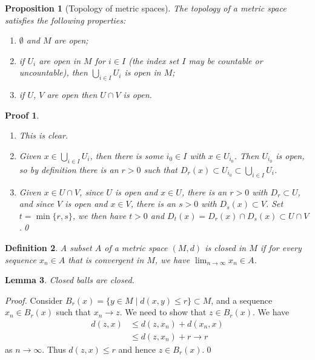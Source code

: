 \documentclass{article}
\theoremstyle{plain}\theoremheaderfont{\normalfont\itshape}\theorembodyfont{\rmfamily}\theoremseparator{.}\newtheorem*{rem}{Remark}\newtheorem*{ex}{Example}\newtheorem*{proof}{Proof}\newtheorem*{altp}{Alternative proof}
\theoremstyle{plain}\theoremheaderfont{\normalfont\bfseries}\theorembodyfont{\rmfamily}\theoremseparator{.}\newtheorem{thm}{Theorem}[section]\newtheorem{lem}[thm]{Lemma}\newtheorem{prop}[thm]{Proposition}\newtheorem*{cor}{Corollary}\newtheorem{defn}[thm]{Definition}\newtheorem{clm}[thm]{Claim}\newtheorem{clminproof}{Claim}
\theoremstyle{break}\theoremheaderfont{\normalfont\itshape}\theorembodyfont{\rmfamily}\theoremseparator{.\medskip}\newtheorem*{proofskip}{Proof}\newtheorem*{exs}{Examples}\newtheorem*{rems}{Remarks}
\theoremstyle{break}\theoremheaderfont{\normalfont\bfseries}\theorembodyfont{\rmfamily}\theoremseparator{.\medskip}\newtheorem{lemskip}[thm]{Lemma}\newtheorem{defnskip}[thm]{Definition}\newtheorem{propskip}[thm]{Proposition}\newtheorem{thmskip}[thm]{Theorem}
\newcommand{\qed}{\hfill\ensuremath{\Box}}
\begin{document}
    \begin{prop}[Topology of metric spaces]
        The topology of a metric space satisfies the following properties:
        \begin{enumerate}[label=(\roman*),topsep=0pt]
            \item \(\emptyset\) and \(M\) are open;
            \item if \(U_i\) are open in \(M\) for \(i\in I\) (the index set \(I\) may be countable or uncountable), then \(\bigcup_{i\in I}U_i\) is open in \(M\);
            \item if \(U\), \(V\) are open then \(U\cap V\) is open.
        \end{enumerate}
    \end{prop}
    \begin{proofskip}
        \begin{enumerate}[label=(\roman*),topsep=0pt]
            \item This is clear.
            \item Given \(x\in \bigcup_{i\in I} U_i\), then there is some \(i_0\in I\) with \(x\in U_{i_0}\). Then \(U_{i_0}\) is open, so by definition there is an \(r>0\) such that \(D_r(x)\subset U_{i_0}\subset \bigcup_{i\in I} U_i\).
            \item Given \(x\in U\cap V\), since \(U\) is open and \(x\in U\), there is an \(r>0\) with \(D_r\subset U\), and since \(V\) is open and \(x\in V\), there is an \(s>0\) with \(D_s(x)\subset V\). Set \(t=\min\{r,s\}\), we then have \(t>0\) and \(D_t(x)=D_r(x)\cap D_s(x)\subset U\cap V\).\qed
        \end{enumerate}
    \end{proofskip}

    \begin{defn}
        A subset \(A\) of a metric space \((M,d)\) is \textit{closed} in \(M\) if for every sequence \(x_n\in A\) that is convergent in \(M\), we have \(\lim_{n\to\infty}x_n\in A\).
    \end{defn}

    \begin{lem}
        Closed balls are closed.
    \end{lem}
    \begin{proof}
        Consider \(B_r(x)=\{y\in M\mid d(x,y)\le r\}\subset M\), and a sequence \(x_n\in B_r(x)\) such that \(x_n\to z\). We need to show that \(z\in B_r(x)\). We have
        \begin{align*}
            d(z,x)&\le d(z,x_n)+d(x_n,x)\\
            &\le d(z,x_n)+r\to r 
        \end{align*}
        as \(n\to\infty\). Thus \(d(z,x)\le r\) and hence \(z\in B_r(x)\).\qed
    \end{proof}
    
\end{document}
